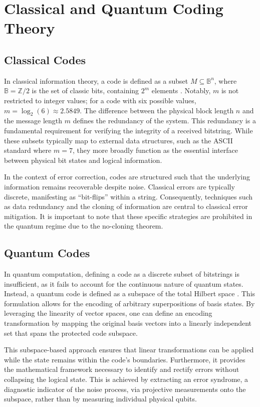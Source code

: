 \chapter{Classical and Quantum Coding Theory}

\section{Classical Codes}

In classical information theory, a code is defined as a subset $M \subseteq \mathbb{B}^n$, where $\mathbb{B} = \mathbb{Z}/2$ is the set of classic bits, containing $2^m$ elements \citep{Kitaev2002}. Notably, $m$ is not restricted to integer values; for a code with six possible values, $m = \log_2(6) \approx 2.5849$. The difference between the physical block length $n$ and the message length $m$ defines the redundancy of the system. This redundancy is a fundamental requirement for verifying the integrity of a received bitstring. While these subsets typically map to external data structures, such as the ASCII standard where $m = 7$, they more broadly function as the essential interface between physical bit states and logical information.

In the context of error correction, codes are structured such that the underlying information remains recoverable despite noise. Classical errors are typically discrete, manifesting as ``bit-flips'' within a string. Consequently, techniques such as data redundancy and the cloning of information are central to classical error mitigation. It is important to note that these specific strategies are prohibited in the quantum regime due to the no-cloning theorem.

\section{Quantum Codes}

In quantum computation, defining a code as a discrete subset of bitstrings is insufficient, as it fails to account for the continuous nature of quantum states. Instead, a quantum code is defined as a subspace of the total Hilbert space \citep{Kitaev2002}. This formulation allows for the encoding of arbitrary superpositions of basis states. By leveraging the linearity of vector spaces, one can define an encoding transformation by mapping the original basis vectors into a linearly independent set that spans the protected code subspace.

This subspace-based approach ensures that linear transformations can be applied while the state remains within the code's boundaries. Furthermore, it provides the mathematical framework necessary to identify and rectify errors without collapsing the logical state. This is achieved by extracting an error syndrome, a diagnostic indicator of the noise process, via projective measurements onto the subspace, rather than by measuring individual physical qubits.

